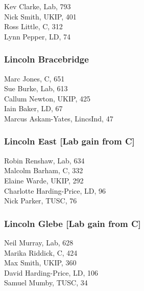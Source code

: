 \documentclass[a4paper,openany,10pt]{book}
\begin{document}


Kev Clarke, Lab, 793\\
Nick Smith, UKIP, 401\\
Ross Little, C, 312\\
Lynn Pepper, LD, 74\\


\subsubsection*{Lincoln Bracebridge}



Marc Jones, C, 651\\
Sue Burke, Lab, 613\\
Callum Newton, UKIP, 425\\
Iain Baker, LD, 67\\
{Marcus Askam-Yates}, LincsInd, 47\\


\subsubsection*{Lincoln East \hspace*{\fill}\nolinebreak[1]%
\enspace\hspace*{\fill}
[Lab gain from C]}



Robin Renshaw, Lab, 634\\
Malcolm Barham, C, 332\\
Elaine Warde, UKIP, 292\\
{Charlotte Harding-Price}, LD, 96\\
Nick Parker, TUSC, 76\\


\subsubsection*{Lincoln Glebe \hspace*{\fill}\nolinebreak[1]%
\enspace\hspace*{\fill}
[Lab gain from C]}



Neil Murray, Lab, 628\\
Marika Riddick, C, 424\\
Max Smith, UKIP, 360\\
David Harding-Price, LD, 106\\
Samuel Mumby, TUSC, 34\\
\end{document}

